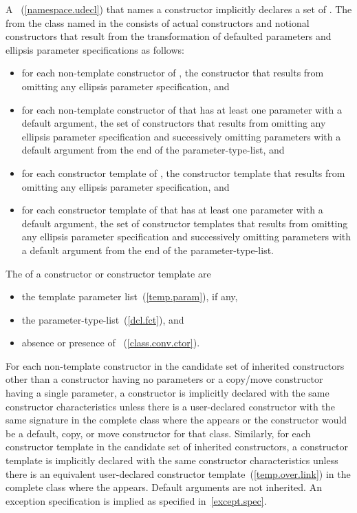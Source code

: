 \pnum
A ~(\ref{namespace.udecl}) that names a
constructor implicitly declares a set of .
The  from the class 
named in the  consists of actual constructors and
notional constructors that result from the transformation of defaulted
parameters and ellipsis parameter specifications as follows:

\begin{itemize}
\item for each non-template constructor of ,
the constructor that results from
omitting any ellipsis parameter specification, and
\item for each non-template constructor of 
that has at least one parameter with a default argument,
the set of constructors that results from
omitting any ellipsis parameter specification and
successively omitting parameters with a default argument
from the end of the parameter-type-list, and
\item for each constructor template of ,
the constructor template that results from
omitting any ellipsis parameter specification, and
\item for each constructor template of 
that has at least one parameter with a default argument,
the set of constructor templates that results from
omitting any ellipsis parameter specification and
successively omitting parameters with a default argument
from the end of the parameter-type-list.
\end{itemize}

\pnum
The  of a constructor or constructor template are

\begin{itemize}
\item the template parameter list~(\ref{temp.param}), if any,
\item the parameter-type-list~(\ref{dcl.fct}), and
\item absence or presence of ~(\ref{class.conv.ctor}).
\end{itemize}

\pnum
For each non-template constructor in the candidate set of inherited constructors other
than a constructor having no parameters or a copy/move constructor having a single parameter,
a constructor is implicitly declared with the same constructor characteristics unless
there is a user-declared constructor with the same signature in the complete class where the
 appears or the constructor would be a default, copy, or move
constructor for that class. Similarly, for each constructor template in the
candidate set of inherited constructors, a constructor template is implicitly declared
with the same constructor characteristics unless there is an equivalent user-declared
constructor template~(\ref{temp.over.link}) in the complete class where the 
appears. \enternote Default arguments are not inherited. An
exception specification is implied as specified
in~\ref{except.spec}.\exitnote

